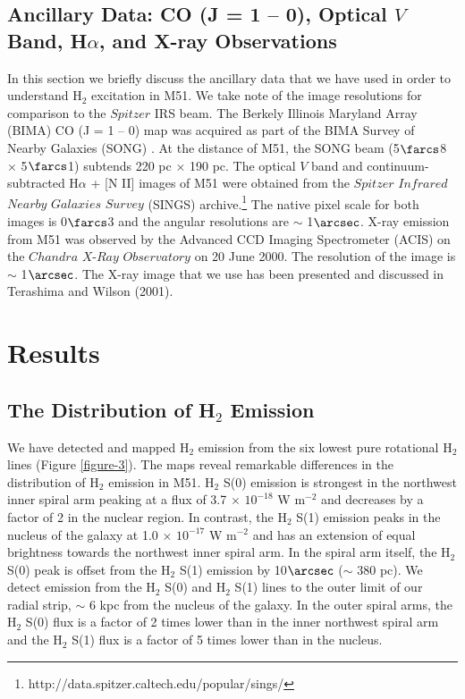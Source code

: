 \documentclass[12pt,preprint]{aastex}
\begin{document}
 
\subsection{Ancillary Data: CO (J = 1 -- 0), Optical $V$ Band, H$\alpha$, and X-ray Observations}

In this section we briefly discuss the ancillary data that we 
have used in order to understand H$_2$ excitation in M51.  
We take note of the image resolutions for comparison to the
$Spitzer$ IRS beam.  The Berkely Illinois Maryland Array (BIMA) CO (J = 1 -- 0) map was
acquired as part of the BIMA Survey of Nearby Galaxies (SONG)
\citep{reg01, hel03}.  At the distance of M51, the SONG beam
(5$\farcs$8 $\times$ 5$\farcs$1) subtends 220 pc $\times$ 190 pc.  
The optical $V$ band and continuum-subtracted H$\alpha$ + [N II] images of M51 were obtained from the $Spitzer$ $Infrared$ $Nearby$ $Galaxies$ $Survey$ (SINGS) archive.\footnote{http://data.spitzer.caltech.edu/popular/sings/} 
The native pixel scale for both images is 0$\farcs$3 
and the angular resolutions are $\sim$ 1$\arcsec$.  X-ray 
emission from M51 was observed by the Advanced CCD 
Imaging Spectrometer (ACIS) on the $Chandra$ $X$-$Ray$ 
$Observatory$ on 20 June 2000.  The resolution of 
the image is $\sim$ 1$\arcsec$.  The X-ray image that 
we use has been presented and discussed in 
Terashima and Wilson (2001).

\section{Results}

\subsection{The Distribution of H$_2$ Emission}

We have detected and mapped H$_2$ emission from the six
lowest pure rotational H$_2$ lines (Figure \ref{figure-3}).  The
maps reveal remarkable differences in the distribution of
H$_2$ emission in M51.  H$_2$ S(0) emission is
strongest in the northwest inner spiral arm peaking at a flux of 3.7
$\times$ $\mathrm{10^{-18}}$ W $\mathrm{m^{-2}}$ and decreases by a
factor of 2 in the nuclear region.  In contrast, the H$_2$
S(1) emission peaks in the nucleus of the galaxy at
1.0 $\times$ $\mathrm{10^{-17}}$ W $\mathrm{m^{-2}}$ and has an
extension of equal brightness towards the northwest inner spiral arm.  In the
spiral arm itself, the H$_2$ S(0) peak is offset from the
H$_2$ S(1) emission by 10$\arcsec$ ($\sim$ 380 pc).  
We detect emission from the H$_2$ S(0) and 
H$_2$ S(1) lines to the outer limit of our radial 
strip,  $\sim$ 6 kpc from the nucleus of the galaxy.  In the outer spiral arms,
the H$_2$ S(0) flux is a factor of 2 times lower than in
the inner northwest spiral arm and the H$_2$ S(1) flux
is a factor of 5 times lower than in the nucleus.
 
\end{document}
